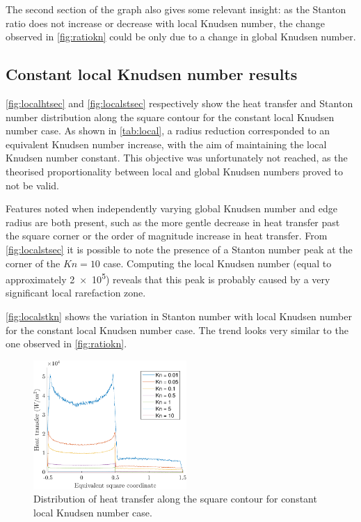 The second section of the graph also gives some relevant insight: as the Stanton ratio does not increase or decrease with local Knudsen number, the change observed in \autoref{fig:ratiokn} could be only due to a change in global Knudsen number.

\subsection{Constant local Knudsen number results}
\autoref{fig:localhtsec} and \autoref{fig:localstsec} respectively show the heat transfer and Stanton number distribution along the square contour for the constant local Knudsen number case. As shown in \autoref{tab:local}, a radius reduction corresponded to an equivalent Knudsen number increase, with the aim of maintaining the local Knudsen number constant. This objective was unfortunately not reached, as the theorised proportionality between local and global Knudsen numbers proved to not be valid.

Features noted when independently varying global Knudsen number and edge radius are both present, such as the more gentle decrease in heat transfer past the square corner or the order of magnitude increase in heat transfer. From \autoref{fig:localstsec} it is possible to note the presence of a Stanton number peak at the corner of the $Kn = 10$ case. Computing the local Knudsen number (equal to approximately \num{2e5}) reveals that this peak is probably caused by a very significant local rarefaction zone.

\autoref{fig:localstkn} shows the variation in Stanton number with local Knudsen number for the constant local Knudsen number case. The trend looks very similar to the one observed in \autoref{fig:ratiokn}.

\begin{figure}[H]
    \centering
    \includegraphics[width=0.52\textwidth]{Images/4. Results/local/htsec.pdf}
    \caption{Distribution of heat transfer along the square contour for constant local Knudsen number case.}
    \label{fig:localhtsec}
\end{figure}


